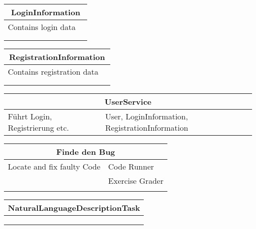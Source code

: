 \documentclass[11pt]{article}
\begin{document}
\begin{table}[h]
\begin{tabularx}{\textwidth}{|X|X|}
\hline
\multicolumn{2}{|c|}{LoginInformation}\\ \hline
Contains login data& \\  \hline
& \\ \hline
 & \\ \hline
\end{tabularx}
\end{table}

\begin{table}[h]
\begin{tabularx}{\textwidth}{|X|X|}
\hline
\multicolumn{2}{|c|}{RegistrationInformation}\\ \hline
Contains registration data& \\  \hline
& \\ \hline
 & \\ \hline
\end{tabularx}
\end{table}

\begin{table}[h]
\begin{tabularx}{\textwidth}{|X|X|}
\hline
\multicolumn{2}{|c|}{UserService}\\ \hline
Führt Login, Registrierung etc. & User, LoginInformation, RegistrationInformation\\  \hline
\end{tabularx}
\end{table}    

\begin{table}[h]
\begin{tabularx}{\textwidth}{|X|X|}
\hline
\multicolumn{2}{|c|}{Finde den Bug}\\ \hline
Locate and fix faulty Code&Code Runner \\  \hline
&Exercise Grader \\ \hline
 & \\ \hline
\end{tabularx}
\end{table}

\begin{table}[h]
\begin{tabularx}{\textwidth}{|X|X|}
\hline
\multicolumn{2}{|c|}{NaturalLanguageDescriptionTask}\\ \hline
& \\  \hline
& \\ \hline
 & \\ \hline
\end{tabularx}
\end{table}
\end{document}
